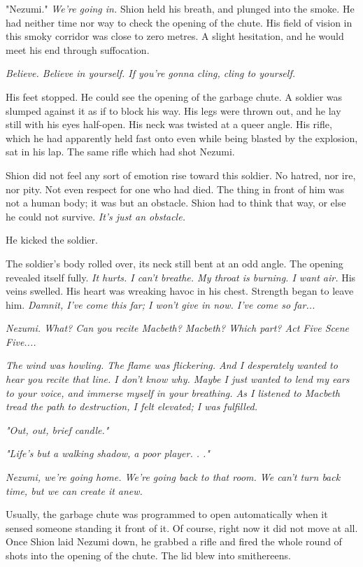 "Nezumi." \emph{We're going in.} Shion held his breath, and plunged into the
smoke. He had neither time nor way to check the opening of the chute.
His field of vision in this smoky corridor was close to zero metres. A
slight hesitation, and he would meet his end through suffocation.

\emph{Believe. Believe in yourself. If you're gonna cling, cling to yourself.}

His feet stopped. He could see the opening of the garbage chute. A
soldier was slumped against it as if to block his way. His legs were
thrown out, and he lay still with his eyes half-open. His neck was
twisted at a queer angle. His rifle, which he had apparently held fast
onto even while being blasted by the explosion, sat in his lap. The same
rifle which had shot Nezumi.

Shion did not feel any sort of emotion rise toward this soldier. No
hatred, nor ire, nor pity. Not even respect for one who had died. The
thing in front of him was not a human body; it was but an obstacle.
Shion had to think that way, or else he could not survive. \emph{It's just an
	obstacle.}

He kicked the soldier.

The soldier's body rolled over, its neck still bent at an odd angle. The
opening revealed itself fully. \emph{It hurts. I can't breathe. My throat is
	burning. I want air.} His veins swelled. His heart was wreaking havoc in
his chest. Strength began to leave him. \emph{Damnit, I've come this far; I
	won't give in now. I've come so far...}

\emph{Nezumi. What? Can you recite \emph{Macbeth}? \emph{Macbeth}? Which part? Act Five
	Scene Five....}

\emph{The wind was howling. The flame was flickering. And I desperately wanted
	to hear you recite that line. I don't know why. Maybe I just wanted to
	lend my ears to your voice, and immerse myself in your breathing. As I
	listened to Macbeth tread the path to destruction, I felt elevated; I
	was fulfilled.}

\emph{"Out, out, brief candle."}

\emph{"Life's but a walking shadow, a poor player. . ."}

\emph{Nezumi, we're going home. We're going back to that room. We can't turn
	back time, but we can create it anew.}

Usually, the garbage chute was programmed to open automatically when it
sensed someone standing it front of it. Of course, right now it did not
move at all. Once Shion laid Nezumi down, he grabbed a rifle and fired
the whole round of shots into the opening of the chute. The lid blew
into smithereens.

